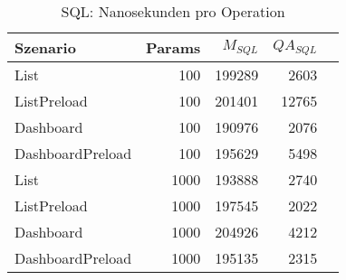 
\begin{table}[ht]
\centering
\caption{SQL: Nanosekunden pro Operation}
\begin{tabular}{lrrrr}
\toprule
Szenario & Params & ${M_{SQL}}$ & ${QA_{SQL}}$   \\
\midrule

	List & 100 & 199289 & 2603 \\
	ListPreload & 100 & 201401 & 12765 \\
	Dashboard & 100 & 190976 & 2076 \\
	DashboardPreload & 100 & 195629 & 5498 \\
	List & 1000 & 193888 & 2740 \\
	ListPreload & 1000 & 197545 & 2022 \\
	Dashboard & 1000 & 204926 & 4212 \\
	DashboardPreload & 1000 & 195135 & 2315 \\
\bottomrule
\end{tabular}
\label{tab:benchmark_sql_nsperop}
\end{table}
	
